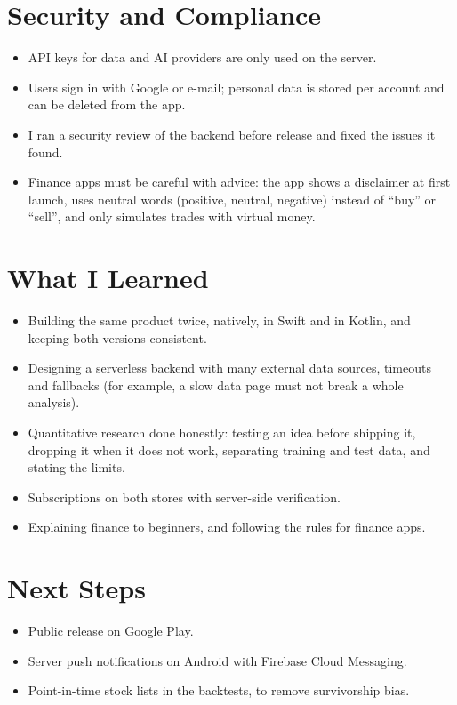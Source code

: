 \documentclass[a4paper,11pt]{article}
\begin{document}
\section{Security and Compliance}

\begin{itemize}
  \item API keys for data and AI providers are only used on the server.
  \item Users sign in with Google or e-mail; personal data is stored per account and can be deleted from the app.
  \item I ran a security review of the backend before release and fixed the issues it found.
  \item Finance apps must be careful with advice: the app shows a disclaimer at first launch, uses neutral words (positive, neutral, negative) instead of ``buy'' or ``sell'', and only simulates trades with virtual money.
\end{itemize}

\section{What I Learned}

\begin{itemize}
  \item Building the same product twice, natively, in Swift and in Kotlin, and keeping both versions consistent.
  \item Designing a serverless backend with many external data sources, timeouts and fallbacks (for example, a slow data page must not break a whole analysis).
  \item Quantitative research done honestly: testing an idea before shipping it, dropping it when it does not work, separating training and test data, and stating the limits.
  \item Subscriptions on both stores with server-side verification.
  \item Explaining finance to beginners, and following the rules for finance apps.
\end{itemize}

\section{Next Steps}
\begin{itemize}
  \item Public release on Google Play.
  \item Server push notifications on Android with Firebase Cloud Messaging.
  \item Point-in-time stock lists in the backtests, to remove survivorship bias.
\end{itemize}
\end{document}
